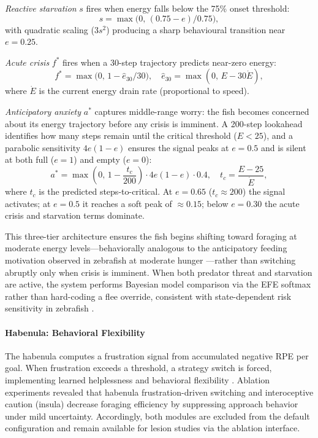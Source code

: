 \documentclass[12pt]{article}
\begin{document}
\textit{Reactive starvation} $s$ fires when energy falls below the
75\% onset threshold:
\begin{equation}\label{eq:starvation}
  s = \max\!\bigl(0,\,(0.75 - e)/0.75\bigr),
\end{equation}
with quadratic scaling ($3s^2$) producing a sharp behavioural
transition near $e = 0.25$.

\textit{Acute crisis} $f^*$ fires when a 30-step trajectory
predicts near-zero energy:
\begin{equation}\label{eq:future_crisis}
  f^* = \max\!\bigl(0,\,1 - \hat{e}_{30}/30\bigr),
  \quad \hat{e}_{30} = \max(0,\,E - 30\dot{E}),
\end{equation}
where $\dot{E}$ is the current energy drain rate (proportional to
speed).

\textit{Anticipatory anxiety} $a^*$ captures middle-range worry:
the fish becomes concerned about its energy trajectory before any
crisis is imminent.
A 200-step lookahead identifies how many steps remain until the
critical threshold ($E < 25$), and a parabolic sensitivity
$4e(1-e)$ ensures the signal peaks at $e = 0.5$ and is silent at
both full ($e = 1$) and empty ($e = 0$):
\begin{equation}\label{eq:anxiety}
  a^* = \max\!\!\left(0,\,1 - \frac{t_c}{200}\right)
        \cdot 4e(1-e) \cdot 0.4,
  \quad t_c = \frac{E - 25}{\dot{E}},
\end{equation}
where $t_c$ is the predicted steps-to-critical.
At $e = 0.65$ ($t_c \approx 200$) the signal activates;
at $e = 0.5$ it reaches a soft peak of $\approx 0.15$;
below $e = 0.30$ the acute crisis and starvation terms dominate.

This three-tier architecture ensures the fish begins shifting
toward foraging at moderate energy levels---behaviorally analogous
to the anticipatory feeding motivation observed in zebrafish at
moderate hunger \citep{marques2018,charnov1976}---rather than
switching abruptly only when crisis is imminent.
When both predator threat and starvation are active, the system
performs Bayesian model comparison via the EFE softmax rather than
hard-coding a flee override, consistent with state-dependent risk
sensitivity in zebrafish \citep{lima1990}.

\paragraph{Habenula: Behavioral Flexibility}

The habenula computes a frustration signal from accumulated negative
RPE per goal.
When frustration exceeds a threshold, a strategy switch is forced,
implementing learned helplessness and behavioral flexibility
\citep{amo2014}.
Ablation experiments revealed that habenula frustration-driven
switching and interoceptive caution (insula) decrease foraging
efficiency by suppressing approach behavior under mild uncertainty.
Accordingly, both modules are excluded from the default configuration
and remain available for lesion studies via the ablation interface.
\end{document}
